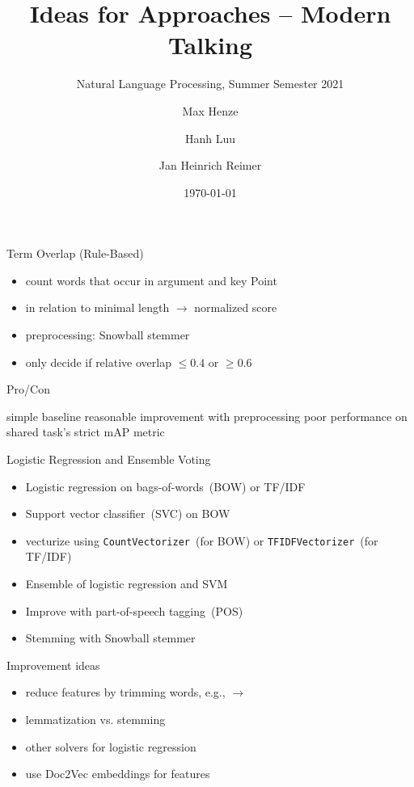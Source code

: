 \documentclass[english,handout]{mlutalk}
\title{Ideas for Approaches -- Modern Talking}
\subtitle{Natural Language Processing, Summer Semester 2021}
\author{Max Henze \and Hanh Luu \and Jan Heinrich Reimer}
\institute{Martin Luther University Halle-Wittenberg}
\date{\today}
\newcommand{\TFIDF}{\mbox{TF/IDF}\xspace}
\newcommand{\mAP}{\mbox{mAP}\xspace}
\begin{document}
\titleframe

\begin{frame}{Term Overlap (Rule-Based)}
  \begin{itemize}
    \item count words that occur in argument and key Point
    \item in relation to minimal length \(\to\) normalized score
    \item preprocessing: Snowball stemmer~\cite{Porter1980}
    \item only decide if relative overlap \(\leq 0.4\) or \(\geq 0.6\)
  \end{itemize}

  \begin{block}{Pro/Con}
    \begin{itemize}
      \pro simple baseline
      \pro reasonable improvement with preprocessing
      \con poor performance on shared task's strict \mAP metric
    \end{itemize}
  \end{block}
\end{frame}

\begin{frame}[allowframebreaks]{Logistic Regression and Ensemble Voting}

  \begin{itemize}
    \item Logistic regression on bags-of-words~(BOW) or \TFIDF \\
    \item Support vector classifier~(SVC) on BOW
    \item vecturize using \lstinline{CountVectorizer}~(for BOW) or \lstinline{TFIDFVectorizer}~(for \TFIDF)
    \item Ensemble of logistic regression and SVM
    \item Improve with part-of-speech tagging~(POS) %
    \item Stemming with Snowball stemmer~\cite{Porter1980}
  \end{itemize}

  \begin{block}{Improvement ideas}
  \begin{itemize}
      \item reduce features by trimming words, e.g.,  \(\to\) 
      \item lemmatization vs. stemming
      \item other solvers for logistic regression
      \item use Doc2Vec embeddings for features
  \end{itemize}
  \end{block}
\end{frame}
\end{document}
